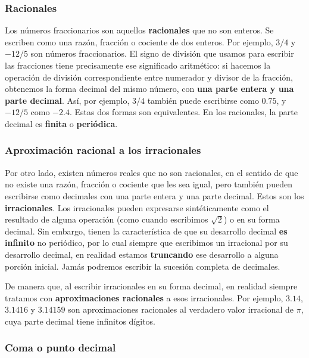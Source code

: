 \documentclass[spanish,a4paper,]{article}
\begin{document}
\hypertarget{racionales}{%
\subsubsection{Racionales}\label{racionales}}

Los números fraccionarios son aquellos \textbf{racionales} que no son
enteros. Se escriben como una razón, fracción o cociente de dos enteros.
Por ejemplo, \(3/4\) y \(-12/5\) son números fraccionarios. El signo de
división que usamos para escribir las fracciones tiene precisamente ese
significado aritmético: si hacemos la operación de división
correspondiente entre numerador y divisor de la fracción, obtenemos la
forma decimal del mismo número, con \textbf{una parte entera y una parte
decimal}. Así, por ejemplo, \(3/4\) también puede escribirse como
\(0.75\), y \(-12/5\) como \(-2.4\). Estas dos formas son equivalentes.
En los racionales, la parte decimal es \textbf{finita} o
\textbf{periódica}.

\hypertarget{aproximaciuxf3n-racional-a-los-irracionales}{%
\subsubsection{Aproximación racional a los
irracionales}\label{aproximaciuxf3n-racional-a-los-irracionales}}

Por otro lado, existen números reales que no son racionales, en el
sentido de que no existe una razón, fracción o cociente que les sea
igual, pero también pueden escribirse como decimales con una parte
entera y una parte decimal. Estos son los \textbf{irracionales}. Los
irracionales pueden expresarse sintéticamente como el resultado de
alguna operación (como cuando escribimos \(\sqrt 2\)) o en su forma
decimal. Sin embargo, tienen la característica de que su desarrollo
decimal \textbf{es infinito} no periódico, por lo cual siempre que
escribimos un irracional por su desarrollo decimal, en realidad estamos
\textbf{truncando} ese desarrollo a alguna porción inicial. Jamás
podremos escribir la sucesión completa de decimales.

De manera que, al escribir irracionales en su forma decimal, en realidad
siempre tratamos con \textbf{aproximaciones racionales} a esos
irracionales. Por ejemplo, \(3.14\), \(3.1416\) y \(3.14159\) son
aproximaciones racionales al verdadero valor irracional de \(\pi\), cuya
parte decimal tiene infinitos dígitos.

\hypertarget{coma-o-punto-decimal}{%
\subsubsection{Coma o punto decimal}\label{coma-o-punto-decimal}}
\end{document}
